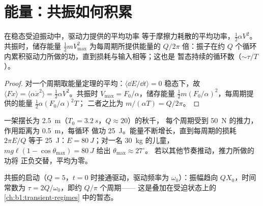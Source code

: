 \section{能量：共振如何积累}

\begin{proposition}[受迫状态下的能量平衡]\label{prop:b1:oscillators-resonance:energy}
在稳态受迫振动中，驱动力提供的平均功率
等于摩擦力耗散的平均功率，$\tfrac12\alpha V^2$。
共振时，储存能量 $\tfrac12 mV_{\max}^2$ 为每周期所提供能量的
$Q/2\pi$ 倍：振子在约
$Q$ 个循环内累积驱动力所做的功，直到损耗与输入相等；这也是
暂态持续的循环数（$\sim\tau/T$）。
\end{proposition}

\begin{proof}
对一个周期取能量定理的平均：$\langle\dd E/\dd t\rangle = 0$
稳态下，故 $\langle F\dot x\rangle = \langle\alpha\dot x^2\rangle =
\tfrac12\alpha V^2$。共振时 $V_{\max} = F_0/\alpha$，储存能量
$\tfrac12 m(F_0/\alpha)^2$，每周期提供的能量 $\tfrac12\alpha(F_0/\alpha)^2T$；
二者之比为 $m/(\alpha T) = Q/2\pi$。
\end{proof}

\begin{example}[秋千]\label{ex:b1:oscillators-resonance:swing}
一架摆长为 \qty{2.5}{m}（$T_0 = \qty{3.2}{s}$，$Q \approx 20$）的秋千，
每个周期受到 \qty{50}{N} 的推力，作用距离为 \qty{0.5}{m}，每循环
做功 \qty{25}{J}。能量不断增长，直到每周期的损耗 $2\pi E/Q$ 等于
\qty{25}{J}：$E = \qty{80}{J}$；对一名 \qty{30}{kg} 的儿童，$mg\ell(1 -
\cos\theta_{\max}) = \qty{80}{J}$ 给出 $\theta_{\max} \approx 27^\circ$。
若以其他节奏推动，推力所做的功将
正负交替，平均为零。
\end{example}

\begin{omfigure}

{\small 共振的启动（$Q = 5$，$t = 0$ 时接通驱动，驱动频率为
$\omega_0$）：振幅趋向 $QX_0$，时间常数为
$\tau = 2Q/\omega_0$，即约 $Q/\pi$ 个周期——
这是叠加在受迫状态上的 \cref{ch:b1:transient-regimes} 中的暂态。}
\end{omfigure}


